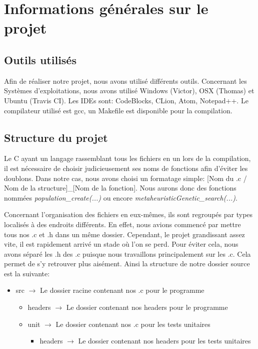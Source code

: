 \documentclass{EPUProjetPeiP}
\begin{document}
\chapter{Informations générales sur le projet}
\section{Outils utilisés}
Afin de réaliser notre projet, nous avons utilisé différents outils. Concernant les Systèmes d'exploitations, nous avons utilisé Windows (Victor), OSX (Thomas) et Ubuntu (Travis CI). Les IDEs sont: CodeBlocks, CLion, Atom, Notepad++. Le compilateur utilisé est gcc, un Makefile est disponible pour la compilation.

\section{Structure du projet}
Le C ayant un langage rassemblant tous les fichiers en un lors de la compilation, il est nécessaire de choisir judicieusement ses noms de fonctions afin d'éviter les doublons. Dans notre cas, nous avons choisi un formatage simple: [Nom du .c / Nom de la structure]\_[Nom de la fonction]. Nous aurons donc des fonctions nommées \textit{population\_create(...)} ou encore \textit{metaheuristicGenetic\_search(...)}.

Concernant l'organisation des fichiers en eux-mêmes, ils sont regroupés par types localisés à des endroits différents. En effet, nous avions commencé par mettre tous nos .c et .h dans un même dossier. Cependant, le projet grandissant assez vite, il est rapidement arrivé un stade où l'on se perd. Pour éviter cela, nous avons séparé les .h des .c puisque nous travaillons principalement sur les .c. Cela permet de s'y retrouver plus aisément. Ainsi la structure de notre dossier source est la suivante:
\begin{itemize}
	\item src $\longrightarrow$ Le dossier racine contenant nos .c pour le programme
	\begin{itemize}
		\item headers $\longrightarrow$ Le dossier contenant nos headers pour le programme
		\item unit $\longrightarrow$ Le dossier contenant nos .c pour les tests unitaires
		\begin{itemize}
			\item headers $\longrightarrow$ Le dossier contenant nos headers pour les tests unitaires\\
		\end{itemize}	
	\end{itemize}
\end{itemize}
\end{document}
